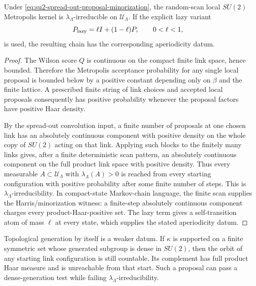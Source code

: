 \begin{proposition}
\label{prop:su2-link-metropolis-haar-irreducibility}
Under \eqref{eq:su2-spread-out-proposal-minorization}, the random-scan local
\(SU(2)\) Metropolis kernel is \(\lambda_\Lambda\)-irreducible on
\(\mathcal U_\Lambda\).  If the explicit lazy variant
\[
  P_{\rm lazy}=\ell I+(1-\ell)P,\qquad 0<\ell<1,
\]
is used, the resulting chain has the corresponding aperiodicity datum.
\end{proposition}

\begin{proof}
The Wilson score \(Q\) is continuous on the compact finite link space, hence
bounded.  Therefore the Metropolis acceptance probability for any single
local proposal is bounded below by a positive constant depending only on
\(\beta\) and the finite lattice.  A prescribed finite string of link choices
and accepted local proposals consequently has positive probability whenever
the proposal factors have positive Haar density.

By the spread-out convolution input, a finite number of proposals at one
chosen link has an absolutely continuous component with positive density on
the whole copy of \(SU(2)\) acting on that link.  Applying such blocks to the
finitely many links gives, after a finite deterministic scan pattern, an
absolutely continuous component on the full product link space with positive
density.  Thus every measurable \(A\subset\mathcal U_\Lambda\) with
\(\lambda_\Lambda(A)>0\) is reached from every starting configuration with
positive probability after some finite number of steps.  This is
\(\lambda_\Lambda\)-irreducibility.  In compact-state Markov-chain language,
the finite scan supplies the Harris/minorization witness: a finite-step
absolutely continuous component charges every product-Haar-positive set.  The
lazy term gives a self-transition atom of mass \(\ell\) at every state, which
supplies the stated aperiodicity datum.
\end{proof}

Topological generation by itself is a weaker datum.  If \(\kappa\) is supported
on a finite symmetric set whose generated subgroup is dense in \(SU(2)\), then
the orbit of any starting link configuration is still countable.  Its
complement has full product Haar measure and is unreachable from that start.
Such a proposal can pass a dense-generation test while failing
\(\lambda_\Lambda\)-irreducibility.

